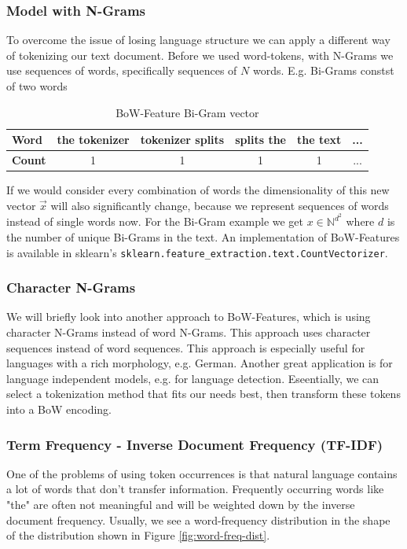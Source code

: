 \subsubsection{Model with N-Grams}
To overcome the issue of losing language structure we can apply a different way of tokenizing our text document.
Before we used word-tokens, with N-Grams we use sequences of words, specifically sequences of $N$ words.
E.g. Bi-Grams constst of two words
\begin{table}[h]
  \centering
  \begin{tabular}{|l|ccccc|}
    \hline
    \textbf{Word} & the tokenizer & tokenizer splits & splits the & the text & ...\\
    \hline
    \textbf{Count} & 1 & 1 & 1 & 1 & ... \\
    \hline
  \end{tabular}
  \caption{BoW-Feature Bi-Gram vector}
  \label{tab:bow-bi-gram}
\end{table}
If we would consider every combination of words the dimensionality of this new vector $\vec{x}$ will also significantly change, because we represent sequences of words instead of single words now.
For the Bi-Gram example we get $x \in \mathbb{N}^{d^2}$ where $d$ is the number of unique Bi-Grams in the text.
An implementation of BoW-Features is available in sklearn's \lstinline{sklearn.feature_extraction.text.CountVectorizer}.

\subsubsection{Character N-Grams}
We will briefly look into another approach to BoW-Features, which is using character N-Grams instead of word N-Grams.
This approach uses character sequences instead of word sequences. This approach is especially useful for languages with a rich morphology, e.g. German.
Another great application is for language independent models, e.g. for language detection.
Eseentially, we can select a tokenization method that fits our needs best, then transform these tokens into a BoW encoding.

\subsubsection{Term Frequency - Inverse Document Frequency (TF-IDF)}
One of the problems of using token occurrences is that natural language contains a lot of words that don't transfer information.
Frequently occurring words like "the" are often not meaningful and will be weighted down by the inverse document frequency.
Usually, we see a word-frequency distribution in the shape of the distribution shown in Figure \ref{fig:word-freq-dist}.


